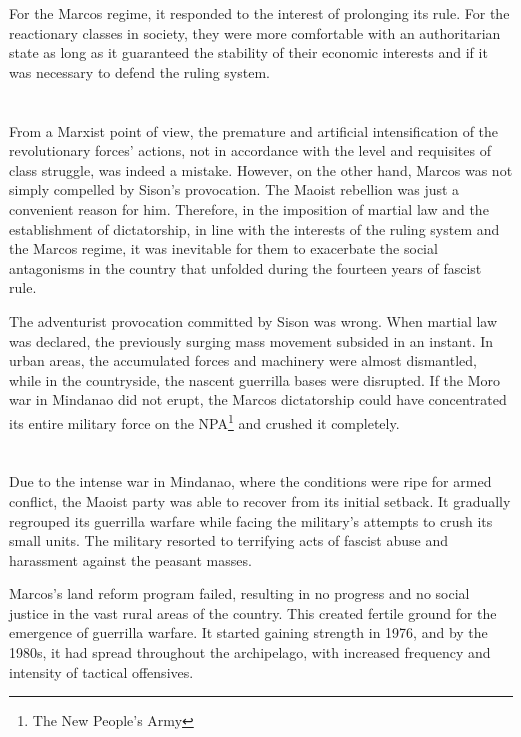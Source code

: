 For the Marcos regime, 
it responded to the interest of prolonging its rule. 
For the reactionary classes in society, 
they were more comfortable with an authoritarian state 
as long as it guaranteed the stability of their economic interests 
and if it was necessary to defend the ruling system.


\section{}
From a Marxist point of view, 
the premature and artificial intensification 
of the revolutionary forces' actions, 
not in accordance with the level and requisites of class struggle, 
was indeed a mistake. 
However, on the other hand, 
Marcos was not simply compelled by Sison's provocation. 
The Maoist rebellion was just a convenient reason for him. 
Therefore, 
in the imposition of martial law and the establishment of dictatorship, 
in line with the interests of the ruling system and the Marcos regime, 
it was inevitable for them to exacerbate 
the social antagonisms in the country 
that unfolded during the fourteen years of fascist rule.

The adventurist provocation committed by Sison was wrong. 
When martial law was declared, 
the previously surging mass movement subsided in an instant. 
In urban areas, 
the accumulated forces and machinery were almost dismantled, 
while in the countryside, 
the nascent guerrilla bases were disrupted. 
If the Moro war in Mindanao did not erupt, 
the Marcos dictatorship could have concentrated 
its entire military force on the NPA\footnote{The New People's Army} 
and crushed it completely.


\section{}
Due to the intense war in Mindanao, 
where the conditions were ripe for armed conflict, 
the Maoist party was able to recover from its initial setback. 
It gradually regrouped its guerrilla warfare 
while facing the military's attempts to crush its small units.
The military resorted to terrifying acts of fascist abuse and harassment 
against the peasant masses.

Marcos's land reform program failed, 
resulting in no progress and no social justice 
in the vast rural areas of the country. 
This created fertile ground for the emergence of guerrilla warfare. 
It started gaining strength in 1976, and by the 1980s, 
it had spread throughout the archipelago, 
with increased frequency and intensity of tactical offensives.

